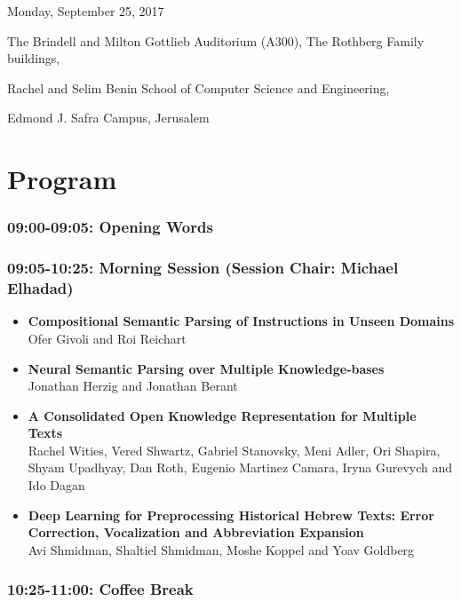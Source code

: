 \documentclass[a0,portrait]{a0poster}
\begin{document}
    \begin{minipage}{.77\textwidth}
    {\fontsize{60pt}{70pt}\selectfont
    Monday, September 25, 2017

    \fontsize{40pt}{60pt}\selectfont
    The Brindell and Milton Gottlieb Auditorium (A300), The Rothberg Family buildings,

    Rachel and Selim Benin School of Computer Science and Engineering,

    Edmond J. Safra Campus, Jerusalem

    }

        \part*{Program}

        \section*{09:00-09:05: Opening Words}

        \section*{09:05-10:25: Morning Session (Session Chair: Michael Elhadad)}

        \begin{itemize}
            \item\LARGE
            \textbf{Compositional Semantic Parsing of Instructions in Unseen
            Domains}\\
            \Large Ofer Givoli and Roi Reichart
            \item\LARGE
            \textbf{Neural Semantic Parsing over Multiple Knowledge-bases}\\
            \Large Jonathan Herzig and Jonathan Berant
            \item\LARGE
            \textbf{A Consolidated Open Knowledge Representation for Multiple
            Texts}\\
            \Large Rachel Wities, Vered Shwartz, Gabriel Stanovsky, Meni Adler, Ori
            Shapira, Shyam Upadhyay, Dan Roth, Eugenio Martinez Camara, Iryna
            Gurevych and Ido Dagan
            \item\LARGE
            \textbf{Deep Learning for Preprocessing Historical Hebrew Texts: Error
            Correction, Vocalization and Abbreviation Expansion}\\
            \Large Avi Shmidman, Shaltiel Shmidman, Moshe Koppel and Yoav Goldberg
        \end{itemize}

        \section*{10:25-11:00: Coffee Break}
    \end{minipage}
\end{document}
